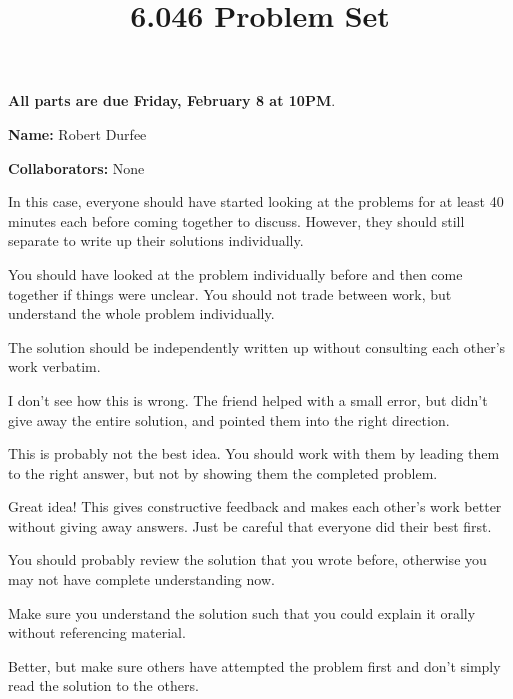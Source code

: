 \documentclass[12pt,twoside]{article}
\title{6.046 Problem Set \theproblemsetnum}
\newcommand{\theproblemsetnum}{0}
\newcommand{\releasedate}{Tuesday, February 5}
\newcommand{\partaduedate}{Friday, February 8}
\begin{document}
\handout{Problem Set \theproblemsetnum}{\releasedate}
\textbf{All parts are due {\bf \partaduedate} at {\bf 10PM}}.

\setlength{\parindent}{0pt}
\medskip\hrulefill\medskip

{\bf Name:} Robert Durfee

\medskip

{\bf Collaborators:} None

\medskip\hrulefill

\begin{problems}

\problem

\begin{problemparts}

\problempart In this case, everyone should have started looking at the
problems for at least 40 minutes each before coming together to discuss.
However, they should still separate to write up their solutions individually.

\problempart You should have looked at the problem individually before and
then come together if things were unclear. You should not trade between work,
but understand the whole problem individually.

\problempart The solution should be independently written up without
consulting each other's work verbatim.

\problempart I don't see how this is wrong. The friend helped with a small
error, but didn't give away the entire solution, and pointed them into the
right direction.

\problempart This is probably not the best idea. You should work with them by
leading them to the right answer, but not by showing them the completed
problem.

\problempart Great idea! This gives constructive feedback and makes each
other's work better without giving away answers. Just be careful that
everyone did their best first.

\problempart You should probably review the solution that you wrote before,
otherwise you may not have complete understanding now.

\problempart Make sure you understand the solution such that you could
explain it orally without referencing material.

\problempart Better, but make sure others have attempted the problem first
and don't simply read the solution to the others.

\end{problemparts}

\end{problems}
\end{document}
